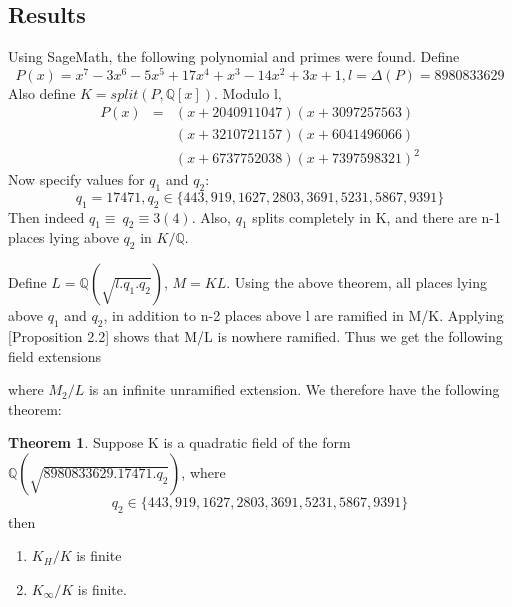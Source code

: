 \documentclass[12pt]{extarticle}
\newcommand{\<}{\langle}
\renewcommand{\>}{\rangle}
\theoremstyle{definition}
\newtheorem{theorem}{Theorem}
\begin{document}
\subsection{Results}
Using SageMath, the following polynomial and primes were found. Define 
\begin{equation}
    P(x) = x^7-3x^6-5x^5+17x^4+x^3-14x^2+3x+1, l=\Delta(P)=8980833629
\end{equation}
Also define $K=split(P,\mathbb{Q}[x])$. Modulo l,
\begin{eqnarray*}
        P(x)&=&(x+2040911047)(x+3097257563)\\ & & {} (x+3210721157)(x+6041496066)\\ & & {}(x+6737752038)(x+7397598321)^2
\end{eqnarray*}
Now specify values for $q_1$ and $q_2$:
\begin{equation}
    q_1=17471,q_2\in\{443,919,1627,2803,3691,5231,5867,9391\}
\end{equation}
Then indeed $q_1\equiv\:q_2\equiv3(4)$. Also, $q_1$ splits completely in K, and there are n-1 places lying above $q_2$ in $K/\mathbb{Q}$.
\par
Define $L=\mathbb{Q}(\sqrt{l.q_1.q_2})$, $M=KL$. Using the above theorem, all places lying above $q_1$ and $q_2$, in addition to n-2 places above l are ramified in M/K.  Applying \cite{MAIR}[Proposition 2.2] shows that M/L is nowhere ramified. Thus we get the following field extensions
\begin{center}
\end{center}
where $M_2/L$ is an infinite unramified extension. We therefore have the following theorem:
\begin{theorem}
    Suppose K is a quadratic field of the form $\mathbb{Q}(\sqrt{8980833629.17471.q_2})$, where 
    \begin{equation}
        q_2\in\{443,919,1627,2803,3691,5231,5867,9391\}
    \end{equation}
    then \begin{enumerate}
        \item $K_H/K$ is finite
        \item $K_\infty/K$ is finite.
    \end{enumerate}
\end{theorem}
\end{document}
